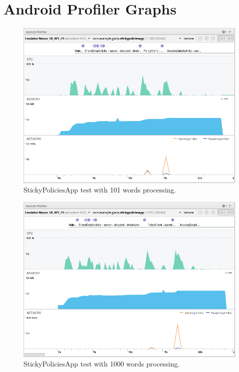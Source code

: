 \chapter{Android Profiler Graphs}
\label{appendixD}
\thispagestyle{empty}
\begin{figure}
	\centering
	\includegraphics[width=0.80\linewidth]{Performance-100words.png}
	\caption{StickyPoliciesApp test with 101 words processing.}
	\label{fig:performance-100words}
\end{figure}

\begin{figure}
	\centering
	\includegraphics[width=0.80\linewidth]{Performance-1000words.png}
	\caption{StickyPoliciesApp test with 1000 words processing.}
	\label{fig:performance-1000words}
\end{figure}
